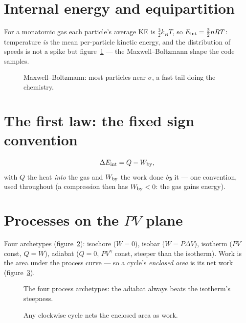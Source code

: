 \section{Internal energy and equipartition}\label{sec:th-internal}

For a monatomic gas each particle's average KE is $\tfrac32k_BT$, so
$E_{\rm int}=\tfrac32nRT$: temperature \emph{is} the mean per-particle
kinetic energy, and the distribution of speeds is not a spike but
figure~\ref{fig:mb} --- the Maxwell--Boltzmann shape the code samples.

\begin{figure}[htbp]\centering

\caption{Maxwell--Boltzmann: most particles near $\sigma$, a fast
tail doing the chemistry.}
\label{fig:mb}
\end{figure}

\section{The first law: the fixed sign convention}\label{sec:th-first}

\begin{equation}
  \Delta E_{\rm int}=Q-W_{\rm by},\label{eq:first}
\end{equation}
with $Q$ the heat \emph{into} the gas and $W_{\rm by}$ the work done
\emph{by} it --- one convention, used throughout (a compression then
has $W_{\rm by}<0$: the gas gains energy).

\section{Processes on the $PV$ plane}\label{sec:th-proc}

Four archetypes (figure~\ref{fig:pv}): isochore ($W=0$), isobar
($W=P\Delta V$), isotherm ($PV$ const, $Q=W$), adiabat ($Q=0$,
$PV^{\gamma}$ const, steeper than the isotherm). Work is the area under
the process curve --- so a cycle's \emph{enclosed area} is its net work
(figure~\ref{fig:cycle}).

\begin{figure}[htbp]\centering

\caption{The four process archetypes: the adiabat always beats the
isotherm's steepness.}
\label{fig:pv}
\end{figure}

\begin{figure}[htbp]\centering

\caption{Any clockwise cycle nets the enclosed area as work.}
\label{fig:cycle}
\end{figure}

